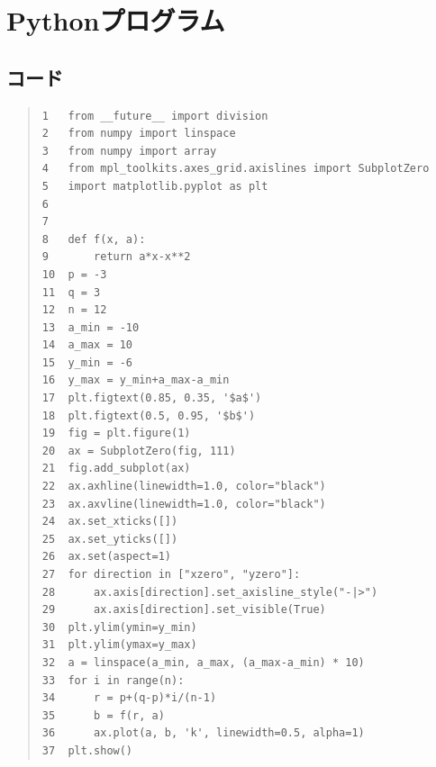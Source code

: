 \documentclass[11pt,a4j,fleqn]{jarticle}
\begin{document}
\newpage
\section{Pythonプログラム}
\subsection{コード}
\begin{quote}
\begin{verbatim}
1  	from __future__ import division
2  	from numpy import linspace
3  	from numpy import array
4  	from mpl_toolkits.axes_grid.axislines import SubplotZero
5  	import matplotlib.pyplot as plt
6  	
7  	
8  	def f(x, a):
9  	    return a*x-x**2
10 	p = -3
11 	q = 3
12 	n = 12
13 	a_min = -10
14 	a_max = 10
15 	y_min = -6
16 	y_max = y_min+a_max-a_min
17 	plt.figtext(0.85, 0.35, '$a$')
18 	plt.figtext(0.5, 0.95, '$b$')
19 	fig = plt.figure(1)
20 	ax = SubplotZero(fig, 111)
21 	fig.add_subplot(ax)
22 	ax.axhline(linewidth=1.0, color="black")
23 	ax.axvline(linewidth=1.0, color="black")
24 	ax.set_xticks([])
25 	ax.set_yticks([])
26 	ax.set(aspect=1)
27 	for direction in ["xzero", "yzero"]:
28 	    ax.axis[direction].set_axisline_style("-|>")
29 	    ax.axis[direction].set_visible(True)
30 	plt.ylim(ymin=y_min)
31 	plt.ylim(ymax=y_max)
32 	a = linspace(a_min, a_max, (a_max-a_min) * 10)
33 	for i in range(n):
34 	    r = p+(q-p)*i/(n-1)
35 	    b = f(r, a)
36 	    ax.plot(a, b, 'k', linewidth=0.5, alpha=1)
37 	plt.show()
\end{verbatim}
\end{quote}
\end{document}
